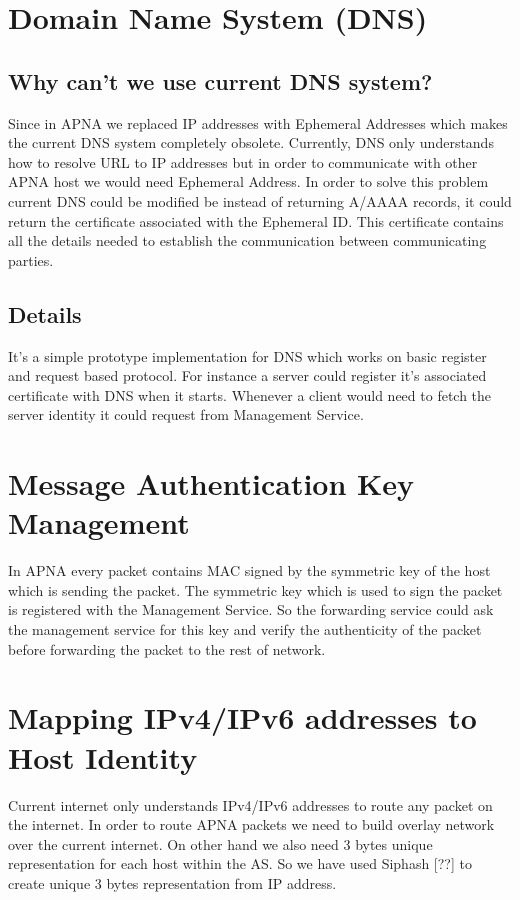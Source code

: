 \section{Domain Name System (DNS)}
\subsection{Why can't we use current DNS system?}
Since in APNA we replaced IP addresses with Ephemeral Addresses which makes the current DNS system completely obsolete. Currently, DNS only understands how to resolve URL to IP addresses but in order to communicate with other APNA host we would need Ephemeral Address. In order to solve this problem current DNS could be modified be instead of returning A/AAAA records, it could return the certificate associated with the Ephemeral ID. This certificate contains all the details needed to establish the communication between communicating parties.

\subsection{Details}
It's a simple prototype implementation for DNS which works on basic register and request based protocol. For instance a server could register it's associated certificate with DNS when it starts. Whenever a client would need to fetch the server identity it could request from Management Service.

\section{Message Authentication Key Management}
In APNA every packet contains MAC signed by the symmetric key of the host which is sending the packet. The symmetric key which is used to sign the packet is registered with the Management Service. So the forwarding service could ask the management service for this key and verify the authenticity of the packet before forwarding the packet to the rest of network.

\section{Mapping IPv4/IPv6 addresses to Host Identity}
Current internet only understands IPv4/IPv6 addresses to route any packet on the internet. In order to route APNA packets we need to build overlay network over the current internet. On other hand we also need 3 bytes unique representation for each host within the AS. So we have used Siphash [??] to create unique 3 bytes representation from IP address.